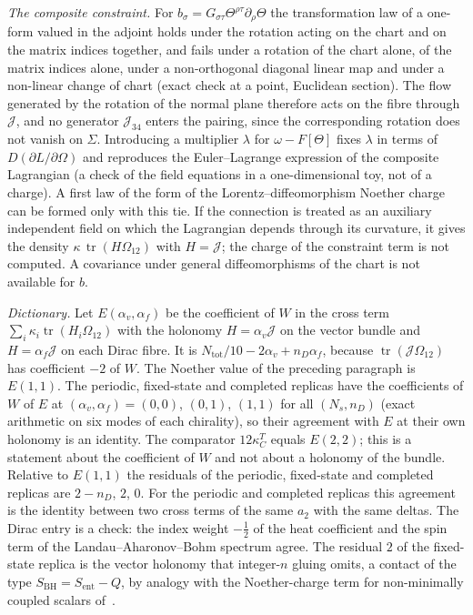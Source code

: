 \emph{The composite constraint.} For \(b_\sigma=G_{\sigma\tau}\Theta^{\rho\tau}\partial_\rho\Theta\) the transformation law of a one-form valued in the adjoint holds under the rotation acting on the chart and on the matrix indices together, and fails under a rotation of the chart alone, of the matrix indices alone, under a non-orthogonal diagonal linear map and under a non-linear change of chart (exact check at a point, Euclidean section). The flow generated by the rotation of the normal plane therefore acts on the fibre through \(\mathcal J\), and no generator \(\mathcal J_{34}\) enters the pairing, since the corresponding rotation does not vanish on \(\Sigma\). Introducing a multiplier \(\lambda\) for \(\omega-F[\Theta]\) fixes \(\lambda\) in terms of \(D(\partial L/\partial\Omega)\) and reproduces the Euler--Lagrange expression of the composite Lagrangian (a check of the field equations in a one-dimensional toy, not of a charge). A first law of the form of the Lorentz--diffeomorphism Noether charge~\cite{JacobsonMohd2015} can be formed only with this tie. If the connection is treated as an auxiliary independent field on which the Lagrangian depends through its curvature, it gives the density \(\kappa\,\operatorname{tr}(H\Omega_{12})\) with \(H=\mathcal J\); the charge of the constraint term is not computed. A covariance under general diffeomorphisms of the chart is not available for \(b\).

\emph{Dictionary.} Let \(E(\alpha_v,\alpha_f)\) be the coefficient of \(W\) in the cross term \(\sum_i\kappa_i\operatorname{tr}(H_i\Omega_{12})\) with the holonomy \(H=\alpha_v\mathcal J\) on the vector bundle and \(H=\alpha_f\mathcal J\) on each Dirac fibre. It is \(N_{\mathrm{tot}}/10-2\alpha_v+n_D\alpha_f\), because \(\operatorname{tr}(\mathcal J\Omega_{12})\) has coefficient \(-2\) of \(W\). The Noether value of the preceding paragraph is \(E(1,1)\). The periodic, fixed-state and completed replicas have the coefficients of \(W\) of \(E\) at \((\alpha_v,\alpha_f)=(0,0)\), \((0,1)\), \((1,1)\) for all \((N_s,n_D)\) (exact arithmetic on six modes of each chirality), so their agreement with \(E\) at their own holonomy is an identity. The comparator \(12\kappa_C^T\) equals \(E(2,2)\); this is a statement about the coefficient of \(W\) and not about a holonomy of the bundle. Relative to \(E(1,1)\) the residuals of the periodic, fixed-state and completed replicas are \(2-n_D\), \(2\), \(0\). For the periodic and completed replicas this agreement is the identity between two cross terms of the same \(a_2\) with the same deltas. The Dirac entry is a check: the index weight \(-\tfrac12\) of the heat coefficient and the spin term of the Landau--Aharonov--Bohm spectrum agree. The residual \(2\) of the fixed-state replica is the vector holonomy that integer-\(n\) gluing omits, a contact of the type \(S_{\mathrm{BH}}=S_{\mathrm{ent}}-Q\), by analogy with the Noether-charge term for non-minimally coupled scalars of~\cite{FrolovFursaev1997}.

